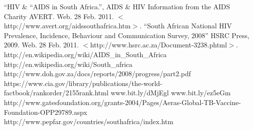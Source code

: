 \documentclass[12pt]{report}
\begin{document}
\begin{thebibliography}{99}
    ``HIV \& ``AIDS in South Africa.'',
        AIDS \& HIV Information from the AIDS Charity AVERT. Web. 28 Feb. 2011. $<$http://www.avert.org/aidssouthafrica.htm$>$.
    ``South African National HIV Prevalence, Incidence, Behaviour and Communication Survey, 2008''
        HSRC Press, 2009. Web. 28 Feb. 2011. $<$http://www.hsrc.ac.za/Document-3238.phtml$>$. 
    http://en.wikipedia.org/wiki/AIDS\_in\_South\_Africa
    http://en.wikipedia.org/wiki/South\_africa
    http://www.doh.gov.za/docs/reports/2008/progress/part2.pdf
    https://www.cia.gov/library/publications/the-world-factbook/rankorder/2155rank.html
    www.bit.ly/dMjEgl
    www.bit.ly/ez5eGm
    http://www.gatesfoundation.org/grants-2004/Pages/Aeras-Global-TB-Vaccine-Foundation-OPP29789.aspx
    http://www.pepfar.gov/countries/southafrica/index.htm
\end{thebibliography}
\end{document}
